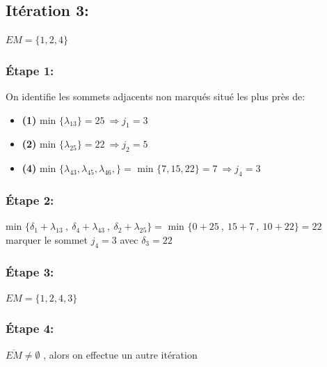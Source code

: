 \documentclass{article}
\begin{document}
\subsection*{Itération 3:}
$EM = \{1,2,4\}$
\subsubsection*{Étape 1:}
On identifie les sommets adjacents non marqués situé les plus près de:
\begin{itemize}
    \item \textbf{(1)} min $\{\lambda_{13}\}=25 \: \Rightarrow j_1 =3$ \\
    \item \textbf{(2)} min $\{\lambda_{25}\}=22 \: \Rightarrow j_2 =5$ \\
    \item \textbf{(4)} min $\{\lambda_{43},\lambda_{45},\lambda_{46},\}=$ min $\{7,15,22\}=7 \: \Rightarrow j_4 =3$ \\
\end{itemize}
\subsubsection*{Étape 2:}
min $\{ \delta_1 + \lambda_{13}\: , \:\delta_4+\lambda_{43} \: ,\:\delta_2+\lambda_{25}\} = $ min $\{0+25 \:,\:15+7 \:,\:10+22\}=22 $\\
marquer le sommet $j_4=3$ avec $\delta_3=22$\\ 
\subsubsection*{Étape 3:}
$EM=\{1,2,4,3\}$
\subsubsection*{Étape 4:}
$\overline{EM} \neq \emptyset $ , alors on effectue un autre itération
\end{document}
